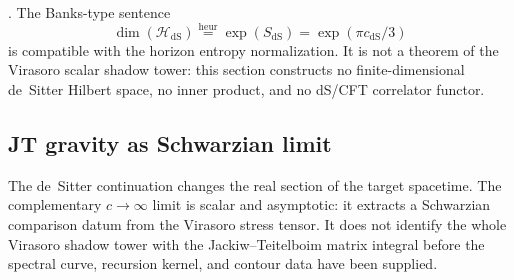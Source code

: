\begin{remark}
\ClaimStatusHeuristic{}.
The Banks-type sentence
\[
\dim(\mathcal H_{\mathrm{dS}})\stackrel{\mathrm{heur}}{=}
\exp(S_{\mathrm{dS}})
=\exp(\pi c_{\mathrm{dS}}/3)
\]
is compatible with the horizon entropy normalization. It is not a
theorem of the Virasoro scalar shadow tower: this section constructs no
finite-dimensional de~Sitter Hilbert space, no inner product, and no
dS/CFT correlator functor.
\end{remark}

%
%

\subsection{JT gravity as Schwarzian limit}
\label{subsec:gravity-jt}

The de~Sitter continuation changes the real section of the target
spacetime. The complementary \(c\to\infty\) limit is scalar and
asymptotic: it extracts a Schwarzian comparison datum from the
Virasoro stress tensor. It does not identify the whole Virasoro shadow
tower with the Jackiw--Teitelboim matrix integral before the spectral
curve, recursion kernel, and contour data have been supplied.

